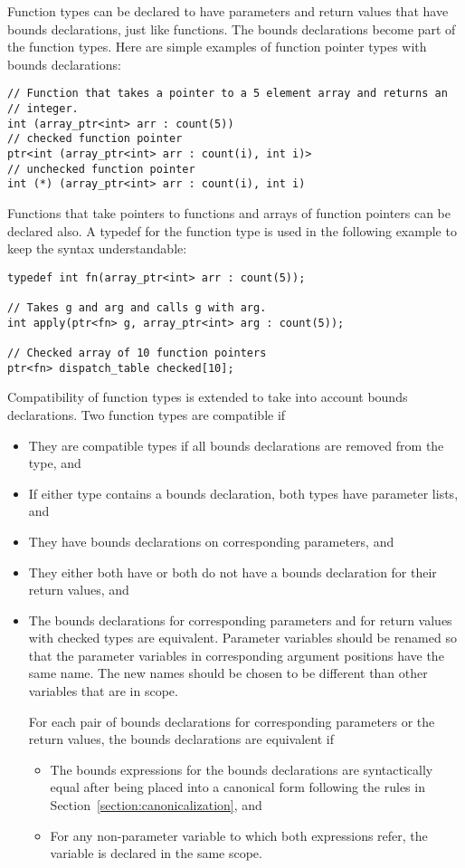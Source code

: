 Function types can be declared to have parameters and return values that have bounds
declarations, just like functions.  The bounds declarations become part of the function types.
Here are simple examples of function pointer types with bounds declarations:
\begin{lstlisting}
// Function that takes a pointer to a 5 element array and returns an
// integer.
int (array_ptr<int> arr : count(5))
// checked function pointer
ptr<int (array_ptr<int> arr : count(i), int i)>
// unchecked function pointer
int (*) (array_ptr<int> arr : count(i), int i)
\end{lstlisting}
Functions that take pointers to functions and arrays of function pointers can
be declared also.  A typedef for the function type is used in the following example
to keep the syntax understandable:
\begin{lstlisting}
typedef int fn(array_ptr<int> arr : count(5));

// Takes g and arg and calls g with arg.
int apply(ptr<fn> g, array_ptr<int> arg : count(5));

// Checked array of 10 function pointers
ptr<fn> dispatch_table checked[10];
\end{lstlisting}

Compatibility of function types is extended to take into account
bounds declarations.  Two function types are compatible if
\begin{itemize}
\item They are compatible types if all bounds declarations are removed from the type, and
\item If either type contains a bounds declaration, both types have parameter lists, and
\item They have bounds declarations on corresponding parameters, and
\item They either both have or both do not have a bounds declaration for their return values, and
\item The bounds declarations for corresponding parameters and for return values with
checked types are equivalent.
Parameter variables should be renamed so that the parameter variables
in corresponding argument positions have the same name.  The new names should be chosen
to be different than other variables that are in scope.

For each pair of bounds declarations for corresponding
parameters or the return values, the bounds declarations are equivalent if
\begin{itemize}
\item The bounds expressions for the bounds declarations are syntactically equal
after being placed into a canonical form following the rules in Section~\ref{section:canonicalization}, and
\item  For any non-parameter variable  to which both expressions refer, the variable is
declared in the same scope.
\end{itemize}
\end{itemize}

